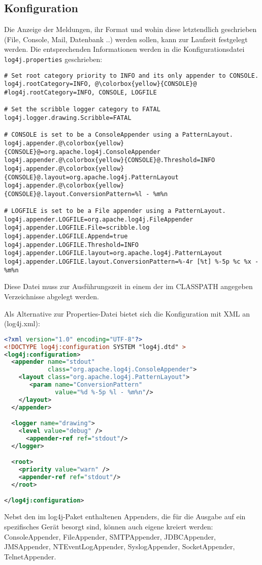 \subsection{Konfiguration}
Die Anzeige der Meldungen, ihr Format und wohin diese letztendlich
geschrieben (File, Console, Mail, Datenbank ..) werden sollen, kann zur
Laufzeit festgelegt werden. Die entsprechenden
Informationen werden in die Konfigurationsdatei \verb+log4j.properties+
geschrieben:
\begin{lstlisting}[escapechar=@]
# Set root category priority to INFO and its only appender to CONSOLE.
log4j.rootCategory=INFO, @\colorbox{yellow}{CONSOLE}@
#log4j.rootCategory=INFO, CONSOLE, LOGFILE

# Set the scribble logger category to FATAL
log4j.logger.drawing.Scribble=FATAL

# CONSOLE is set to be a ConsoleAppender using a PatternLayout.
log4j.appender.@\colorbox{yellow}{CONSOLE}@=org.apache.log4j.ConsoleAppender
log4j.appender.@\colorbox{yellow}{CONSOLE}@.Threshold=INFO
log4j.appender.@\colorbox{yellow}{CONSOLE}@.layout=org.apache.log4j.PatternLayout
log4j.appender.@\colorbox{yellow}{CONSOLE}@.layout.ConversionPattern=%l - %m%n

# LOGFILE is set to be a File appender using a PatternLayout.
log4j.appender.LOGFILE=org.apache.log4j.FileAppender
log4j.appender.LOGFILE.File=scribble.log
log4j.appender.LOGFILE.Append=true
log4j.appender.LOGFILE.Threshold=INFO
log4j.appender.LOGFILE.layout=org.apache.log4j.PatternLayout
log4j.appender.LOGFILE.layout.ConversionPattern=%-4r [%t] %-5p %c %x - %m%n
\end{lstlisting}
Diese Datei muss zur Ausführungszeit in einem der im CLASSPATH angegeben
Verzeichnisse abgelegt werden.

\newslide
Als Alternative zur Properties-Datei bietet sich die Konfiguration mit
XML an (log4j.xml):
\begin{lstlisting}[language=xml]
<?xml version="1.0" encoding="UTF-8"?>
<!DOCTYPE log4j:configuration SYSTEM "log4j.dtd" >
<log4j:configuration>
  <appender name="stdout"
            class="org.apache.log4j.ConsoleAppender">
    <layout class="org.apache.log4j.PatternLayout">
       <param name="ConversionPattern"
              value="%d %-5p %l - %m%n"/>
    </layout>
  </appender>

  <logger name="drawing">
    <level value="debug" />
      <appender-ref ref="stdout"/>
  </logger>

  <root>
    <priority value="warn" />
    <appender-ref ref="stdout"/>
  </root>

</log4j:configuration>
\end{lstlisting}
Nebst den im log4j-Paket enthaltenen Appenders, die für die Ausgabe auf ein
spezifisches Gerät besorgt sind, können auch eigene kreiert werden:
ConsoleAppender, FileAppender, SMTPAppender, JDBCAppender, JMSAppender,
NTEventLogAppender, SyslogAppender, SocketAppender, TelnetAppender.
\newslide


